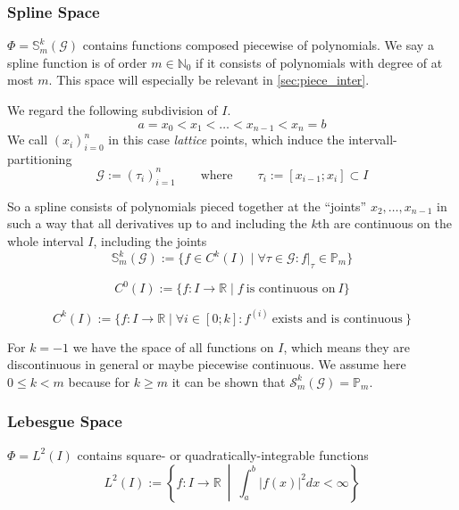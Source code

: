 \subsubsection{Spline Space}
\(\Phi = \mathbb{S}_m^k(\mathcal{G})\) contains functions composed piecewise of polynomials.
We say a spline function is of order \(m \in \mathbb{N}_0\) if it consists of polynomials with degree of at most \(m\).
This space will especially be relevant in \cref{sec:piece_inter}.

We regard the following subdivision of \(I\).
\[a = x_0 < x_1 < \ldots < x_{n-1} < x_n = b\]
We call \((x_i)_{i=0}^n\) in this case \emph{lattice} points, which induce the intervall-partitioning
\[\mathcal{G} := (\tau_i)^n_{i=1} \qquad\text{where}\qquad \tau_i := [x_{i-1}; x_i] \subset I\]
\begin{center}
   
\end{center}

So a spline consists of polynomials pieced together at the ``joints'' \(x_2, \ldots, x_{n-1}\) in such a way that all derivatives up to and including the \(k\)th are continuous on the whole interval \(I\), including the joints
\[\mathbb{S}_m^k(\mathcal{G}) := \{f \in C^k(I) \mid \forall \tau \in \mathcal{G}: f\rvert_\tau \in \mathbb{P}_m\}\]

\begin{definition}
   \[C^0(I) := \{f: I \to \mathbb{R} \mid f~\text{is continuous on}~I\}\]
\end{definition}
\begin{definition}
   \[C^k(I) := \{f: I \to \mathbb{R} \mid \forall i \in [0; k]: f^{(i)}~\text{exists and is continuous}~\}\]
\end{definition}
\begin{remark}
   For \(k = -1\) we have the space of all functions on \(I\), which means they are discontinuous in general or maybe piecewise continuous.
   We assume here \(0 \leq k < m\) because for \(k \geq m\) it can be shown that \(\mathcal{S}_m^k(\mathcal{G}) = \mathbb{P}_m\).
\end{remark}

\subsubsection{Lebesgue Space}
\(\Phi = L^2(I)\) contains square- or quadratically-integrable functions
\[L^2(I) := \left\{f: I \to \mathbb{R}~\middle|~ \int_a^b |f(x)|^2 dx < \infty\right\}\]

